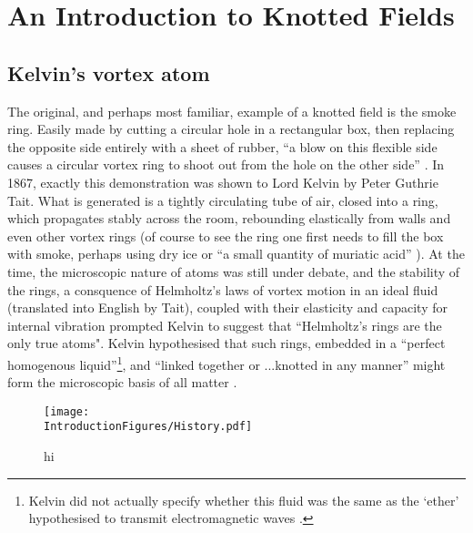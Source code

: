 \chapter{An Introduction to Knotted Fields}

\section{Kelvin's vortex atom}
\label{sec:Kelvin}
The original, and perhaps most familiar, example of a knotted field is the smoke ring. Easily made by cutting a circular hole in a rectangular box, then replacing the opposite side entirely with a sheet of rubber, ``a blow on this flexible side causes a circular vortex ring to shoot out from the hole on the other side'' \citep{Kelvin}. In 1867, exactly this demonstration was shown to Lord Kelvin by Peter Guthrie Tait. What is generated is a tightly circulating tube of air, closed into a ring, which propagates stably across the room, rebounding elastically from walls and even other vortex rings (of course to see the ring one first needs to fill the box with smoke, perhaps using dry ice or ``a small quantity of muriatic acid'' \citep{Kelvin}). At the time, the microscopic nature of atoms was still under debate, and the stability of the rings, a consquence of Helmholtz's laws of vortex motion in an ideal fluid \citep{Helmholtz} (translated into English by Tait), coupled with their elasticity and capacity for internal vibration \citep{KelvinMasters, KelvinAMS} prompted Kelvin to suggest that ``Helmholtz's rings are the only true atoms". Kelvin hypothesised that such rings, embedded in a ``perfect homogenous liquid''\footnote{Kelvin did not actually specify whether this fluid was the same as the `ether' hypothesised to transmit electromagnetic waves \citep{KelvinMasters}.}, and ``linked together or ...knotted in any manner'' might form the microscopic basis of all matter \citep{Kelvin}.
\begin{figure}[htbp]
\centering
\texttt{[image: \\IntroductionFigures/History.pdf]}
\caption{hi }
\label{fig:History}
\end{figure}

